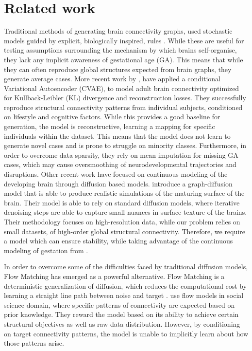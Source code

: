 \documentclass[sigconf, review]{acmart}
\begin{document}
\section{Related work}

Traditional methods of generating brain connectivity graphs, used stochastic models guided by explicit, biologically inspired, rules \cite{betzel_generative_2016}. While these are useful for testing assumptions surrounding the mechanism by which brains self-organise, they lack any implicit awareness of gestational age (GA). This means that while they can often reproduce global structures expected from brain graphs, they generate average cases.
More recent work by \citet{liu_deep_2025}, have applied a conditional Variational Autoencoder (CVAE), to model adult brain connectivity optimized for Kullback-Leibler (KL) divergence and reconstruction losses. They successfully reproduce structural connectivity patterns from individual subjects, conditioned on lifestyle and cognitive factors. While this provides a good baseline for generation, the model is reconstructive, learning a mapping for specific individuals within the dataset. This means that the model does not learn to generate novel cases and is prone to struggle on minority classes. Furthermore, in order to overcome data sparsity, they rely on mean imputation for missing GA cases, which may cause oversmoothing of neurodevelopmental trajectories and disruptions. 
Other recent work \cite{xie_controllable_2026} have focused on continuous modeling of the developing brain through diffusion based models. \citet{xie_controllable_2026} introduce a graph-diffusion model that is able to produce realistic simulations of the maturing surface of the brain. Their model is able to rely on standard diffusion models, where iterative denoising steps are able to capture small nuances in surface texture of the brains. Their methodology focuses on high-resolution data, while our problem relies on small datasets, of high-order global structural connectivity. Therefore, we require a model which can ensure stability, while taking advantage of the continuous modeling of gestation from \citet{xie_controllable_2026}.



In order to overcome some of the difficulties faced by traditional diffusion models, Flow Matching has emerged as a powerful alternative. Flow Matching is a deterministic generalization of diffusion, which reduces the computational cost by learning a straight line path between noise and target \cite{lipman2023flowmatchinggenerativemodeling, yan2025trajflow}.  \citet{zhang2024generative} use flow models in social science domain, where specific patterns of connectivity are expected based on prior knowledge. They reward the model based on its ability to achieve certain structural objectives as well as raw data distribution. However, by conditioning on target connectivity patterns, the model is unable to implicitly learn about how those patterns arise.
\end{document}
